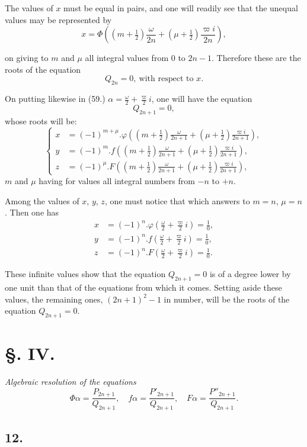 \documentclass{article}
\begin{document}
The values of $x$ must be equal in pairs, and one will readily see that the unequal values may be represented by
\[ x=\Phi\left((m+\tfrac{1}{2})\frac{\omega}{2n}+(\mu+\tfrac{1}{2})\frac{\varpi i}{2n}\right), \tag{65.} \]

on giving to $m$ and $\mu$ all integral values from 0 to $2n-1$. Therefore these are the roots of the equation
\[ Q_{2n}=0,\ \text{with respect to } x. \]

On putting likewise in (59.) $\alpha=\frac{\omega}{2}+\frac{\varpi}{2}i$, one will have the equation
\[ Q_{2n+1}=0, \]
whose roots will be:
\[ \left\{\begin{aligned}
x&=(-1)^{m+\mu}.\varphi\left((m+\tfrac{1}{2})\frac{\omega}{2n+1}+(\mu+\tfrac{1}{2})\frac{\varpi i}{2n+1}\right),\\
y&=(-1)^{m}.f\left((m+\tfrac{1}{2})\frac{\omega}{2n+1}+(\mu+\tfrac{1}{2})\frac{\varpi i}{2n+1}\right),\\
z&=(-1)^{\mu}.F\left((m+\tfrac{1}{2})\frac{\omega}{2n+1}+(\mu+\tfrac{1}{2})\frac{\varpi i}{2n+1}\right),
\end{aligned}\right. \tag{66.} \]
$m$ and $\mu$ having for values all integral numbers from $-n$ to $+n$.

Among the values of $x$, $y$, $z$, one must notice that which answers to $m=n$, $\mu=n$. Then one has
\[ \begin{aligned}
x&=(-1)^{n}.\varphi\left(\frac{\omega}{2}+\frac{\varpi}{2}i\right)=\frac{1}{0},\\
y&=(-1)^{n}.f\left(\frac{\omega}{2}+\frac{\varpi}{2}i\right)=\frac{1}{0},\\
z&=(-1)^{n}.F\left(\frac{\omega}{2}+\frac{\varpi}{2}i\right)=\frac{1}{0}.
\end{aligned} \]

These infinite values show that the equation $Q_{2n+1}=0$ is of a degree lower by one unit than that of the equations from which it comes. Setting aside these values, the remaining ones, $(2n+1)^{2}-1$ in number, will be the roots of the equation $Q_{2n+1}=0$.

\section*{§. IV.}

\emph{Algebraic resolution of the equations}
\[ \Phi\alpha=\frac{P_{2n+1}}{Q_{2n+1}},\quad f\alpha=\frac{P'_{2n+1}}{Q_{2n+1}},\quad F\alpha=\frac{P''_{2n+1}}{Q_{2n+1}}. \]

\subsection*{12.}
\end{document}
